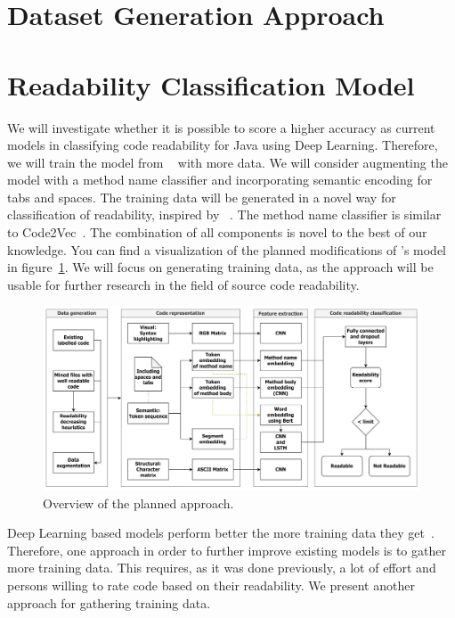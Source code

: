\documentclass[%
class=scrreprt,
chapterprefix=false,%
open=right,%
twoside=false,%
paper=a4,%
logofile={Logo\_zentral\_farbig\_EN.png},%
thesistype=master,%
UKenglish,%
]{se2thesis}
\begin{document}
	\section{Dataset Generation Approach} \label{Dataset Generation Approach}
	\section{Readability Classification Model} \label{Readability Classification Model}

	
	We will investigate whether it is possible to score a higher accuracy as current models in classifying code readability for Java using Deep Learning. Therefore, we will train the model from \citeauthor{mi2022towards}~\cite{mi2022towards} with more data. We will consider augmenting the model with a method name classifier and incorporating semantic encoding for tabs and spaces. The training data will be generated in a novel way for classification of readability, inspired by \citeauthor{loriot2022styler}~\cite{loriot2022styler}. The method name classifier is similar to Code2Vec~\cite{alon2019code2vec}. The combination of all components is novel to the best of our knowledge. You can find a visualization of the planned modifications of \citeauthor{mi2022towards}'s model in figure~\ref{fig:model_pipeline}. We will focus on generating training data, as the approach will be usable for further research in the field of source code readability.
	
	\begin{figure}[t]
		\centering
		\includegraphics[width=\textwidth]{Model_pipeline.png}
		\caption{Overview of the planned approach.}
		\label{fig:model_pipeline}
	\end{figure}
	
	Deep Learning based models perform better the more training data they get~\cite{hestness2017deep}. Therefore, one approach in order to further improve existing models is to gather more training data.
	This requires, as it was done previously, a lot of effort and persons willing to rate code based on their readability. We present another approach for gathering training data.
	
\end{document}
